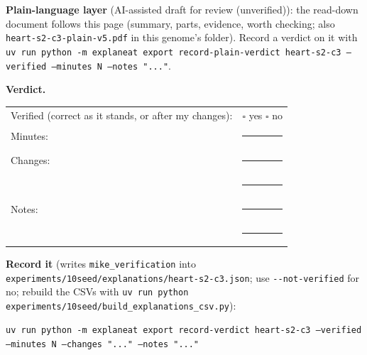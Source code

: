 \documentclass[a4paper,11pt]{article}
\begin{document}
\textbf{Plain-language layer} (AI-assisted draft for review (unverified)): the read-down document follows this page (summary, parts, evidence, worth checking; also \texttt{heart-s2-c3-plain-v5.pdf} in this genome's folder). Record a verdict on it with \texttt{uv run python -m explaneat export record-plain-verdict heart-s2-c3 --verified --minutes N --notes "..."}.

\textbf{Verdict.}

\begin{tabularx}{\linewidth}{@{}lX@{}}
Verified (correct as it stands, or after my changes): & $\square$ yes \quad $\square$ no \\[4pt]
Minutes: & \rule{3cm}{0.4pt} \\[4pt]
Changes: & \rule{\linewidth}{0.4pt} \\[10pt]
 & \rule{\linewidth}{0.4pt} \\[4pt]
Notes: & \rule{\linewidth}{0.4pt} \\[10pt]
 & \rule{\linewidth}{0.4pt} \\
\end{tabularx}

\textbf{Record it} (writes \texttt{mike\_verification} into \texttt{experiments/10seed/explanations/heart-s2-c3.json}; use \texttt{-{}-not-verified} for no; rebuild the CSVs with \texttt{uv run python experiments/10seed/build\_explanations\_csv.py}):

{\footnotesize\raggedright\texttt{uv run python -m explaneat export record-verdict heart-s2-c3 --verified --minutes N --changes "..." --notes "..."}\par}


\clearpage














\clearpage
\end{document}
